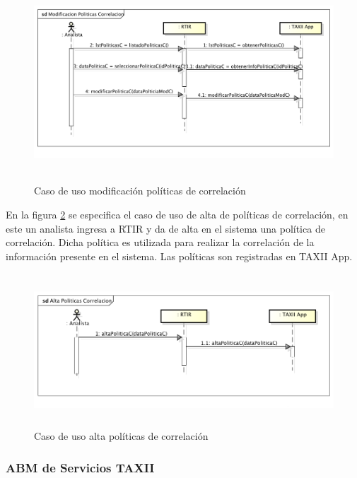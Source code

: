 \begin{figure}[H]
	\centering
	\includegraphics[width=5.7638in,height=2.9256in]{Analisis22-img/Analisis22-img021.png} 
	\caption{Caso de uso modificación políticas de correlación}
	\label{fig.modificacioncorrelacion}
\end{figure}

\bigskip

	En la figura \ref{fig.altacorrelacion} se especifica el caso de uso de alta de políticas de correlación, en este un analista ingresa a RTIR y
	da de alta en el sistema una política de correlación. Dicha política es utilizada para realizar la correlación de la
	información presente en el sistema. Las políticas son registradas en TAXII App.
	
\begin{figure}[H]
	\centering
	\includegraphics[width=5.7638in,height=2.2535in]{Analisis22-img/Analisis22-img022.png} 
	\caption{Caso de uso alta políticas de correlación}
	\label{fig.altacorrelacion}
\end{figure}

\subsubsection{ABM de Servicios TAXII}

